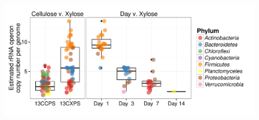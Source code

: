 \begin{figure}[H]
	\begin{center}
	\centerline{\includegraphics[width=\textwidth]{figures/copy_number/copy_number.pdf}}
	\caption{\protect}\label{fig:copy}
        \end{center}
\end{figure}
